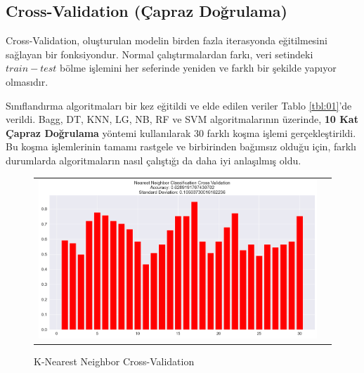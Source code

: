 \documentclass[conference]{IEEEtran}
\begin{document}
\pagebreak

\newpage
\subsection{\textbf{Cross-Validation (Çapraz Doğrulama)}}
\quad Cross-Validation, oluşturulan modelin birden fazla iterasyonda eğitilmesini sağlayan bir fonksiyondur. Normal çalıştırmalardan farkı, veri setindeki $train-test$ bölme işlemini her seferinde yeniden ve farklı bir şekilde yapıyor olmasıdır.

\quad Sınıflandırma algoritmaları bir kez eğitildi ve elde edilen veriler Tablo \ref{tbl:01}'de verildi. Bagg, DT, KNN, LG, NB, RF ve SVM algoritmalarının üzerinde, \textbf{10 Kat Çapraz Doğrulama} yöntemi kullanılarak 30 farklı koşma işlemi gerçekleştirildi. Bu koşma işlemlerinin tamamı rastgele ve birbirinden bağımsız olduğu için, farklı durumlarda algoritmaların nasıl çalıştığı da daha iyi anlaşılmış oldu.


\begin{figure}[!h]
	\centering
	\begin{center}
		\begin{tabular}{cc}
			\includegraphics[scale=0.2]{pictures/pic_17.png}&
		\end{tabular}
	\end{center}
	\caption{K-Nearest Neighbor Cross-Validation}
	\label{fig:17}
\end{figure}
\end{document}
